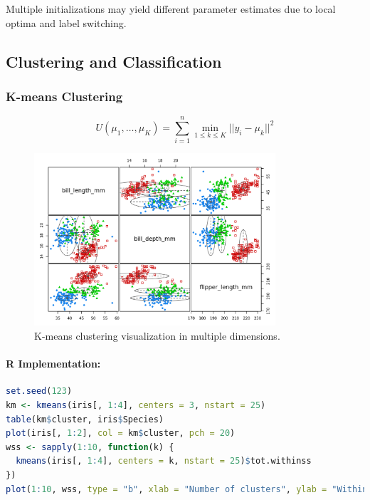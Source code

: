 \documentclass[11pt,a4paper]{article}
\begin{document}
\begin{warningbox}
Multiple initializations may yield different parameter estimates due to local optima and label switching.
\end{warningbox}

\subsection{Clustering and Classification}

\subsubsection{K-means Clustering}
\begin{equation}
U(\mu_1, \ldots, \mu_K) = \sum_{i=1}^n \min_{1 \le k \le K} ||y_i - \mu_k||^2
\end{equation}

\begin{figure}[htb]
    \centering
    \includegraphics[width=0.8\textwidth]{kmeans-clustering.png}
    \caption{K-means clustering visualization in multiple dimensions.}
    \label{fig:kmeans}
\end{figure}

\paragraph{R Implementation:}
\begin{lstlisting}[language=R]
set.seed(123)
km <- kmeans(iris[, 1:4], centers = 3, nstart = 25)
table(km$cluster, iris$Species)
plot(iris[, 1:2], col = km$cluster, pch = 20)
wss <- sapply(1:10, function(k) {
  kmeans(iris[, 1:4], centers = k, nstart = 25)$tot.withinss
})
plot(1:10, wss, type = "b", xlab = "Number of clusters", ylab = "Within-cluster sum of squares")
\end{lstlisting}
\end{document}
